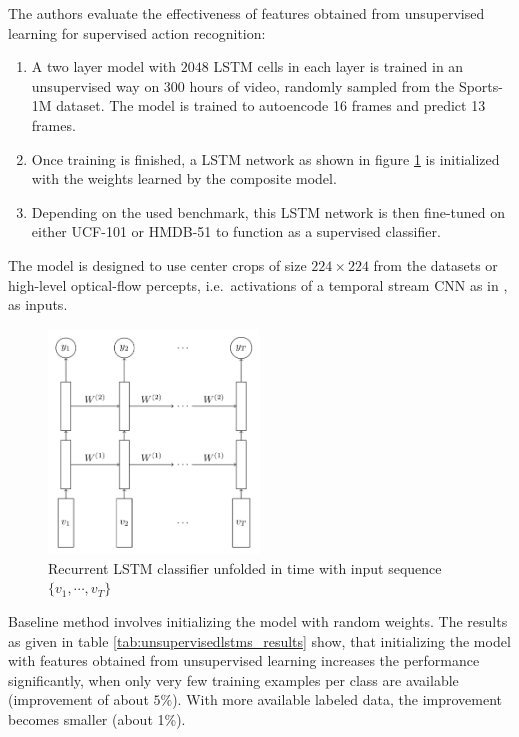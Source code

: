 The authors evaluate the effectiveness of features obtained from unsupervised learning for supervised action recognition:

\begin{enumerate}
    \item A two layer model with $2048$ LSTM cells in each layer is trained in an unsupervised way on 300 hours of video, randomly sampled from the Sports-1M dataset.
        The model is trained to autoencode 16 frames and predict 13 frames.
    \item Once training is finished, a LSTM network as shown in figure \ref{fig:unsupervisedlstms_classifier} is initialized with the weights learned by the composite model.
    \item Depending on the used benchmark, this LSTM network is then fine-tuned on either UCF-101 or HMDB-51 to function as a supervised classifier.
\end{enumerate}

The model is designed to use center crops of size $224 \times 224$ from the datasets or high-level optical-flow percepts, i.e.\ activations of a temporal stream CNN as in \cite{simonyan_two-stream_2014}, as inputs.

\begin{figure}[H]
    \centering
    \includegraphics[width=0.5\textwidth]{img_deep/unsupervisedlstms_classifier}
    \caption{Recurrent LSTM classifier unfolded in time with input sequence $\{v_1, \cdots, v_T\}$ \cite{srivastava_unsupervised_2015}}
    \label{fig:unsupervisedlstms_classifier}
\end{figure}

Baseline method involves initializing the model with random weights.
The results as given in table \ref{tab:unsupervisedlstms_results} show, that initializing the model with features obtained from unsupervised learning increases the performance significantly, when only very few training examples per class are available (improvement of about $5\%$).
With more available labeled data, the improvement becomes smaller (about 1\%).

